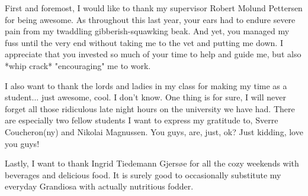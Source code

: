 \begin{acknowledgement}
First and foremost, I would like to thank my supervisor Robert Molund Pettersen for being awesome. As throughout this last year, your ears had to endure severe pain from my twaddling gibberish-squawking beak. And yet, you managed my fuss until the very end without taking me to the vet and putting me down. I appreciate that you invested so much of your time to help and guide me, but also *whip crack* "encouraging" me to work.

I also want to thank the lords and ladies in my class for making my time as a student... just awesome, cool. I don't know. One thing is for sure, I will never forget all those ridiculous late night hours on the university we have had. There are especially two fellow students I want to express my gratitude to, Sverre Coucheron(ny) and Nikolai Magnussen. You guys, are, just, ok? Just kidding, love you guys!

Lastly, I want to thank Ingrid Tiedemann Gjersøe for all the cozy weekends with beverages and delicious food. It is surely good to occasionally substitute my everyday Grandiosa with actually nutritious fodder.
\end{acknowledgement}